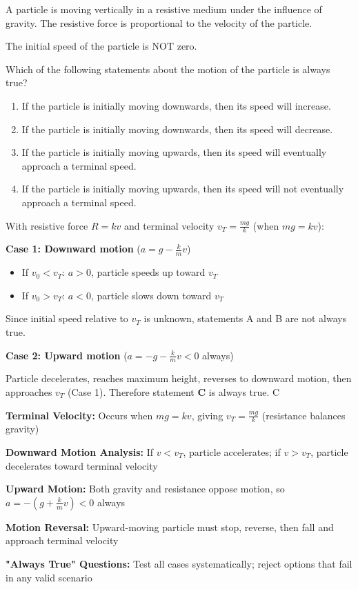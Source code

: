 \begin{problem}
A particle is moving vertically in a resistive medium under the influence of gravity. The resistive force is proportional to the velocity of the particle.

The initial speed of the particle is NOT zero.

Which of the following statements about the motion of the particle is always true?

\begin{enumerate}[label=\textbf{\Alph*.}]
    \item If the particle is initially moving downwards, then its speed will increase.
    \item If the particle is initially moving downwards, then its speed will decrease.
    \item If the particle is initially moving upwards, then its speed will eventually approach a terminal speed.
    \item If the particle is initially moving upwards, then its speed will not eventually approach a terminal speed.
\end{enumerate}
\end{problem}

\begin{solution}
With resistive force $R = kv$ and terminal velocity $v_T = \frac{mg}{k}$ (when $mg = kv$):

\textbf{Case 1: Downward motion} ($a = g - \frac{k}{m}v$)
\begin{itemize}
    \item If $v_0 < v_T$: $a > 0$, particle speeds up toward $v_T$
    \item If $v_0 > v_T$: $a < 0$, particle slows down toward $v_T$
\end{itemize}
Since initial speed relative to $v_T$ is unknown, statements A and B are not always true.

\textbf{Case 2: Upward motion} ($a = -g - \frac{k}{m}v < 0$ always)

Particle decelerates, reaches maximum height, reverses to downward motion, then approaches $v_T$ (Case 1). Therefore statement \textbf{C} is always true. $\boxed{\text{C}}$
\end{solution}

\begin{takeaways}
\item \textbf{Terminal Velocity:} Occurs when $mg = kv$, giving $v_T = \frac{mg}{k}$ (resistance balances gravity)
\item \textbf{Downward Motion Analysis:} If $v < v_T$, particle accelerates; if $v > v_T$, particle decelerates toward terminal velocity
\item \textbf{Upward Motion:} Both gravity and resistance oppose motion, so $a = -(g + \frac{k}{m}v) < 0$ always
\item \textbf{Motion Reversal:} Upward-moving particle must stop, reverse, then fall and approach terminal velocity
\item \textbf{"Always True" Questions:} Test all cases systematically; reject options that fail in any valid scenario
\end{takeaways}
